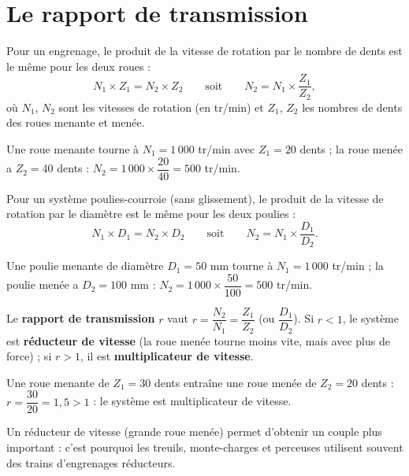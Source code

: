 \section{Le rapport de transmission}

\begin{propriete}
Pour un engrenage, le produit de la vitesse de rotation par le nombre de dents est le
même pour les deux roues :
\[
N_1\times Z_1=N_2\times Z_2 \qquad\text{soit}\qquad N_2=N_1\times\frac{Z_1}{Z_2},
\]
où $N_1$, $N_2$ sont les vitesses de rotation (en tr/min) et $Z_1$, $Z_2$ les nombres de
dents des roues menante et menée.
\end{propriete}

\begin{exemple}
Une roue menante tourne à $N_1=1\,000$ tr/min avec $Z_1=20$ dents ; la roue menée a
$Z_2=40$ dents : $N_2=1\,000\times\dfrac{20}{40}=500$ tr/min.
\end{exemple}

\begin{propriete}
Pour un système poulies-courroie (sans glissement), le produit de la vitesse de rotation
par le diamètre est le même pour les deux poulies :
\[
N_1\times D_1=N_2\times D_2 \qquad\text{soit}\qquad N_2=N_1\times\frac{D_1}{D_2}.
\]
\end{propriete}

\begin{exemple}
Une poulie menante de diamètre $D_1=50$ mm tourne à $N_1=1\,000$ tr/min ; la poulie
menée a $D_2=100$ mm : $N_2=1\,000\times\dfrac{50}{100}=500$ tr/min.
\end{exemple}

\begin{definition}
Le \textbf{rapport de transmission} $r$ vaut $r=\dfrac{N_2}{N_1}=\dfrac{Z_1}{Z_2}$ (ou
$\dfrac{D_1}{D_2}$). Si $r<1$, le système est \textbf{réducteur de vitesse} (la roue
menée tourne moins vite, mais avec plus de force) ; si $r>1$, il est
\textbf{multiplicateur de vitesse}.
\end{definition}

\begin{exemple}
Une roue menante de $Z_1=30$ dents entraîne une roue menée de $Z_2=20$ dents :
$r=\dfrac{30}{20}=1{,}5>1$ : le système est multiplicateur de vitesse.
\end{exemple}

\begin{remarque}
Un réducteur de vitesse (grande roue menée) permet d'obtenir un couple plus important :
c'est pourquoi les treuils, monte-charges et perceuses utilisent souvent des trains
d'engrenages réducteurs.
\end{remarque}

